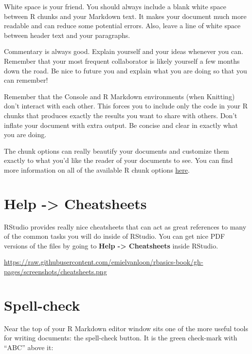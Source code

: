 \documentclass[]{tufte-book}
\begin{document}
White space is your friend. You should always include a blank white space between R chunks and your Markdown text. It makes your document much more readable and can reduce some potential errors. Also, leave a line of white space between header text and your paragraphs.

Commentary is always good. Explain yourself and your ideas whenever you can. Remember that your most frequent collaborator is likely yourself a few months down the road. Be nice to future you and explain what you are doing so that you can remember!

Remember that the Console and R Markdown environments (when Knitting) don't interact with each other. This forces you to include only the code in your R chunks that produces exactly the results you want to share with others. Don't inflate your document with extra output. Be concise and clear in exactly what you are doing.

The chunk options can really beautify your documents and customize them exactly to what you'd like the reader of your documents to see. You can find more information on all of the available R chunk options \href{http://yihui.name/knitr/options/}{here}.

\hypertarget{help---cheatsheets}{%
\section{Help -\textgreater{} Cheatsheets}\label{help---cheatsheets}}

RStudio provides really nice cheatsheets that can act as great references to many of the common tasks you will do inside of RStudio. You can get nice PDF versions of the files by going to \textbf{Help -\textgreater{} Cheatsheets} inside RStudio.

\vspace{0.1in}\begin{center}\footnotesize{\url{https://raw.githubusercontent.com/emielvanloon/rbasics-book/gh-pages/screenshots/cheatsheets.png}}\end{center}\vspace{0.1in}

\hypertarget{spell-check}{%
\section{Spell-check}\label{spell-check}}

Near the top of your R Markdown editor window sits one of the more useful tools for writing documents: the spell-check button. It is the green check-mark with ``ABC'' above it:
\end{document}
